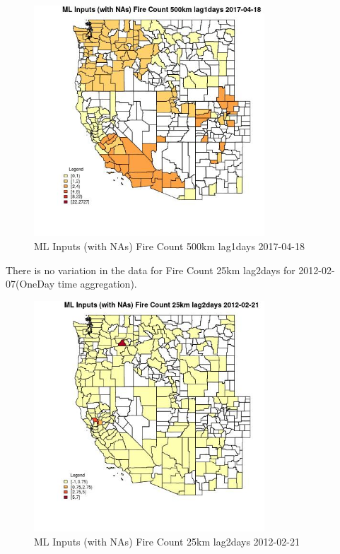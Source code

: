 \begin{figure} 
\centering  
\includegraphics[width=0.77\textwidth]{Code_Outputs/Report_ML_input_PM25_Step4_part_f_de_duplicated_aves_prioritize_24hr_obswNAs_CountyFire_Count_500km_lag1daysMean2017-04-18.jpg} 
\caption{\label{fig:Report_ML_input_PM25_Step4_part_f_de_duplicated_aves_prioritize_24hr_obswNAsCountyFire_Count_500km_lag1daysMean2017-04-18}ML Inputs (with NAs) Fire Count 500km lag1days 2017-04-18} 
\end{figure} 
 

There is no variation in the data for Fire Count 25km lag2days for 2012-02-07(OneDay time aggregation). 
 

\begin{figure} 
\centering  
\includegraphics[width=0.77\textwidth]{Code_Outputs/Report_ML_input_PM25_Step4_part_f_de_duplicated_aves_prioritize_24hr_obswNAs_CountyFire_Count_25km_lag2daysMean2012-02-21.jpg} 
\caption{\label{fig:Report_ML_input_PM25_Step4_part_f_de_duplicated_aves_prioritize_24hr_obswNAsCountyFire_Count_25km_lag2daysMean2012-02-21}ML Inputs (with NAs) Fire Count 25km lag2days 2012-02-21} 
\end{figure} 
 

